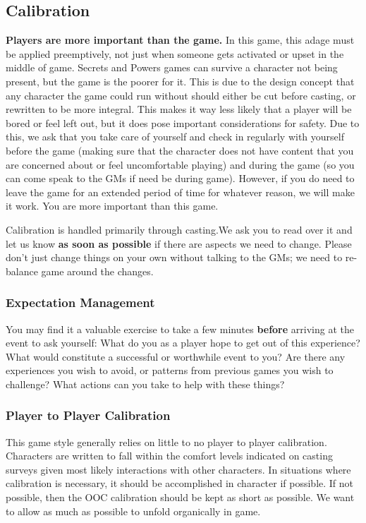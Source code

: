 \documentclass[sheet]{GL2020}
\begin{document}
\subsection{Calibration}
\textbf{Players are more important than the game.} In this game, this adage must be applied preemptively, not just when someone gets activated or upset in the middle of game. Secrets and Powers games can survive a character not being present, but the game is the poorer for it. This is due to the design concept that any character the game could run without should either be cut before casting, or rewritten to be more integral. This makes it way less likely that a player will be bored or feel left out, but it does pose important considerations for safety. Due to this, we ask that you take care of yourself and check in regularly with yourself before the game (making sure that the character does not have content that you are concerned about or feel uncomfortable playing) and during the game (so you can come speak to the GMs if need be during game). However, if you do need to leave the game for an extended period of time for whatever reason, we will make it work. You are more important than this game.

Calibration is handled primarily through casting.We ask you to read over it and let us know \textbf{as soon as possible} if there are aspects we need to change. Please don't just change things on your own without talking to the GMs; we need to re-balance game around the changes.

\subsubsection{Expectation Management}
You may find it a valuable exercise to take a few minutes \textbf{before} arriving at the event to ask yourself: What do you as a player hope to get out of this experience? What would constitute a successful or worthwhile event to you? Are there any experiences you wish to avoid, or patterns from previous games you wish to challenge? What actions can you take to help with these things?

\subsubsection{Player to Player Calibration}
This game style generally relies on little to no player to player calibration. Characters are written to fall within the comfort levels indicated on casting surveys given most likely interactions with other characters. In situations where calibration is necessary, it should be accomplished in character if possible. If not possible, then the OOC calibration should be kept as short as possible. We want to allow as much as possible to unfold organically in game.
\end{document}
